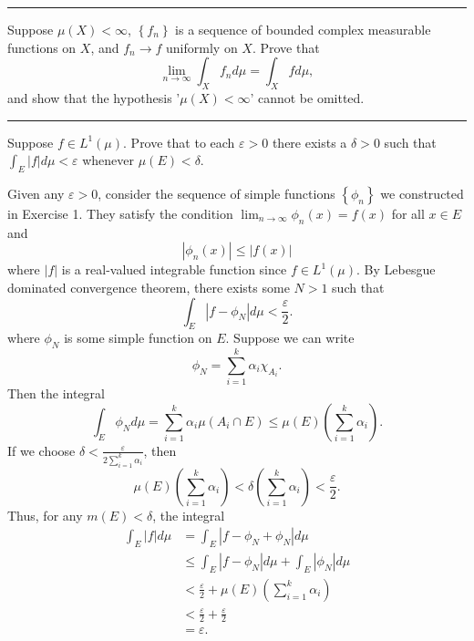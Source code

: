 \documentclass[letterpaper, 12pt]{article}
\begin{document}
\noindent\rule{7in}{2.8pt}
\begin{problem}{1.10}
Suppose \(\mu(X)<\infty\), \(\left\{ f_n \right\}\) is a sequence of bounded complex measurable functions on \(X\), and \(f_n\to f\) uniformly on \(X\). Prove that 
\[\lim_{n\to \infty}\int_X f_n d\mu=\int_X fd\mu,\]
and show that the hypothesis '\(\mu(X)<\infty\)' cannot be omitted.
\end{problem}
\begin{solution}

\end{solution}

\noindent\rule{7in}{2.8pt}
\begin{problem}{1.12}
Suppose \(f\in L^1(\mu)\). Prove that to each \(\varepsilon>0\) there exists a \(\delta>0\) such that \(\int_E|f|d\mu<\varepsilon\) whenever \(\mu(E)<\delta\). 
\end{problem}
\begin{solution}
Given any \(\varepsilon>0\), consider the sequence of simple functions \(\left\{ \phi_n \right\}\) we constructed in Exercise 1. They satisfy the condition \(\lim_{n\to \infty}\phi_n(x)=f(x)\) for all \(x\in E\) and 
\[|\phi_n(x)|\leq |f(x)|\]
where \(|f|\) is a real-valued integrable function since \(f\in L^1(\mu)\). By Lebesgue dominated convergence theorem, there exists some \(N>1\) such that 
\[\int_E |f-\phi_N|d\mu<\frac{\varepsilon}{2}.\]
where \(\phi_N\) is some simple function on \(E\). Suppose we can write 
\[\phi_N=\sum_{i=1}^{k}\alpha_i \chi_{A_i}.\]
Then the integral 
\[\int_E \phi_Nd\mu=\sum_{i=1}^{k}\alpha_i\mu(A_i\cap E)\leq \mu(E)(\sum_{i=1}^{k}\alpha_i).\] 
If we choose \(\delta<\frac{\varepsilon}{2\sum_{i=1}^{k}\alpha_i}\), then 
\[\mu(E)(\sum_{i=1}^{k}\alpha_i)<\delta(\sum_{i=1}^{k}\alpha_i)<\frac{\varepsilon}{2}.\]
Thus, for any \(m(E)<\delta\), the integral 
\begin{align*}
     \int_E |f|d\mu&=\int_E|f-\phi_N+\phi_N|d\mu\\
                   &\leq \int_E |f-\phi_N|d\mu +\int_E|\phi_N|d\mu\\
                   &< \frac{\varepsilon}{2}+\mu(E)(\sum_{i=1}^{k}\alpha_i)\\
                   &<\frac{\varepsilon}{2}+\frac{\varepsilon}{2}\\
                   &=\varepsilon.
\end{align*}
\end{solution}
\end{document}
